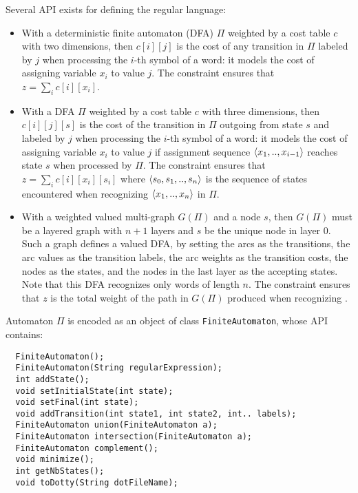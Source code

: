 Several API exists for defining the regular language:
\begin{itemize}
\item With a deterministic finite automaton (DFA) $\Pi$ weighted by a cost table $c$ with two dimensions, then $c[i][j]$ is the cost of any transition in $\Pi$ labeled by $j$ when processing the $i$-th symbol of a word: it models the cost of assigning variable $x_i$ to value $j$. The constraint ensures that $z=\sum_i c[i][x_i]$.
\item With a DFA $\Pi$ weighted by a cost table $c$ with three dimensions, then $c[i][j][s]$ is the cost of the transition in $\Pi$ outgoing from state $s$ and labeled by $j$ when processing the $i$-th symbol of a word: it models the cost of assigning variable $x_i$ to value $j$ if assignment sequence $\langle x_1,..,x_{i-1}\rangle$ reaches state $s$ when processed by $\Pi$.  The constraint ensures that $z=\sum_i c[i][x_i][s_i]$ where $\langle s_0, s_1,..,s_n\rangle$ is the sequence of states encountered when recognizing $\langle x_1,..,x_{n}\rangle$ in $\Pi$.
\item With a weighted valued multi-graph $G(\Pi)$ and a node $s$, then $G(\Pi)$ must be a layered graph with $n+1$ layers and $s$ be the unique node in layer 0. Such a graph defines a valued DFA, by setting the arcs as the transitions, the arc values as the transition labels, the arc weights as the transition costs, the nodes as the states, and the nodes in the last layer as the accepting states. Note that this DFA recognizes only words of length $n$. The constraint ensures that $z$ is the total weight of the path in $G(\Pi)$ produced when recognizing .  
\end{itemize}

Automaton $\Pi$ is encoded as an object of class \texttt{FiniteAutomaton}, whose API contains:
\begin{lstlisting}
  FiniteAutomaton();
  FiniteAutomaton(String regularExpression);
  int addState();
  void setInitialState(int state); 
  void setFinal(int state); 
  void addTransition(int state1, int state2, int.. labels);
  FiniteAutomaton union(FiniteAutomaton a);
  FiniteAutomaton intersection(FiniteAutomaton a);
  FiniteAutomaton complement();
  void minimize();
  int getNbStates();
  void toDotty(String dotFileName);
\end{lstlisting}

